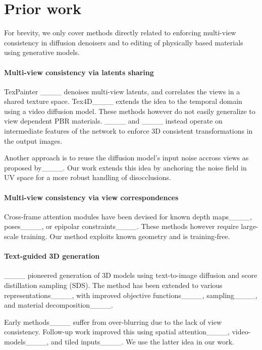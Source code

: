 \section{Prior work}
\label{sec:prior}



For brevity, we only cover methods directly related to enforcing multi-view consistency in diffusion denoisers and to editing of physically based materials using generative models.







\paragraph{Multi-view consistency via latents sharing}
TexPainter ____ denoises multi-view latents, and correlates the views in a shared texture space.
Tex4D____ extends the idea to the temporal domain using a video diffusion model.
These methods however do not easily generalize to view dependent PBR materials.
____ and ____ instead operate on intermediate features of the network to enforce 3D consistent transformations in the output images.

Another approach is to reuse the diffusion model's input noise accross views as proposed by____.
Our work extends this idea by anchoring the noise field in UV space for a more robust handling of disocclusions.


\paragraph{Multi-view consistency via view correspondences}
Cross-frame attention modules have been devised for known depth maps____, poses____, or epipolar constraints____.
These methods however require large-scale training.
Our method exploits known geometry and is training-free.

\paragraph{Text-guided 3D generation}
____ pioneered generation of 3D models 
using text-to-image diffusion and score distillation sampling (SDS).
The method has been extended to various representations____, 
with improved objective functions____, 
sampling____, and material decomposition____.

Early methods____ suffer from over-blurring due to the lack of view consistency. 
Follow-up work improved this using spatial attention____, video-models____, and tiled inputs____.
We use the latter idea in our work.

